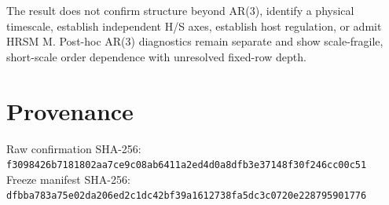 \documentclass[11pt]{article}
\begin{document}
The result does not confirm structure beyond AR(3), identify a physical
timescale, establish independent H/S axes, establish host regulation, or admit
HRSM M.  Post-hoc AR(3) diagnostics remain separate and show scale-fragile,
short-scale order dependence with unresolved fixed-row depth.

\section*{Provenance}
Raw confirmation SHA-256: \nolinkurl{f3098426b7181802aa7ce9c08ab6411a2ed4d0a8dfb3e37148f30f246cc00c51}\\
Freeze manifest SHA-256: \nolinkurl{dfbba783a75e02da206ed2c1dc42bf39a1612738fa5dc3c0720e228795901776}
\end{document}
